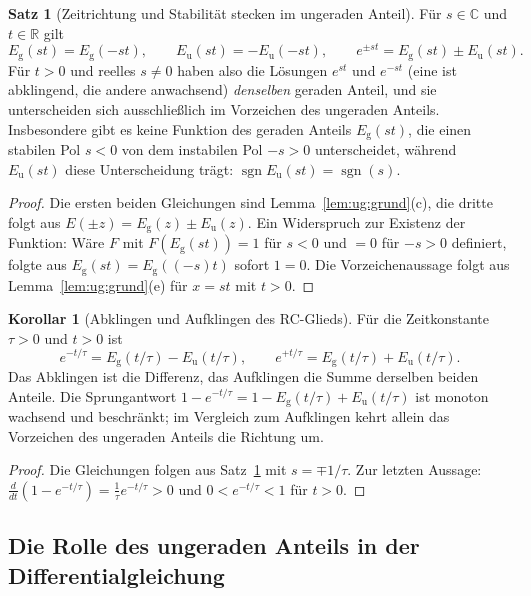 \documentclass[a4paper,12pt,twoside]{report}
\theoremstyle{definition}
\newtheorem{satz}{Satz}
\newtheorem{korollar}{Korollar}
\begin{document}
\begin{satz}[Zeitrichtung und Stabilität stecken im ungeraden Anteil]\label{satz:ug:stab}
Für $s\in\mathbb{C}$ und $t\in\mathbb{R}$ gilt
\[
E_{\mathrm g}(st)=E_{\mathrm g}(-st),\qquad E_{\mathrm u}(st)=-E_{\mathrm u}(-st),\qquad e^{\pm st}=E_{\mathrm g}(st)\pm E_{\mathrm u}(st).
\]
Für $t>0$ und reelles $s\neq0$ haben also die Lösungen $e^{st}$ und $e^{-st}$ (eine ist abklingend, die andere anwachsend) \emph{denselben} geraden Anteil, und sie unterscheiden sich ausschließlich im Vorzeichen des ungeraden Anteils. Insbesondere gibt es keine Funktion des geraden Anteils $E_{\mathrm g}(st)$, die einen stabilen Pol $s<0$ von dem instabilen Pol $-s>0$ unterscheidet, während $E_{\mathrm u}(st)$ diese Unterscheidung trägt: $\operatorname{sgn}E_{\mathrm u}(st)=\operatorname{sgn}(s)$.
\end{satz}

\begin{proof}
Die ersten beiden Gleichungen sind Lemma~\ref{lem:ug:grund}(c), die dritte folgt aus $E(\pm z)=E_{\mathrm g}(z)\pm E_{\mathrm u}(z)$. Ein Widerspruch zur Existenz der Funktion: Wäre $F$ mit $F(E_{\mathrm g}(st))=1$ für $s<0$ und $=0$ für $-s>0$ definiert, folgte aus $E_{\mathrm g}(st)=E_{\mathrm g}((-s)t)$ sofort $1=0$. Die Vorzeichenaussage folgt aus Lemma~\ref{lem:ug:grund}(e) für $x=st$ mit $t>0$.
\end{proof}

\begin{korollar}[Abklingen und Aufklingen des RC-Glieds]\label{kor:ug:rc}
Für die Zeitkonstante $\tau>0$ und $t>0$ ist
\[
e^{-t/\tau}=E_{\mathrm g}(t/\tau)-E_{\mathrm u}(t/\tau),\qquad e^{+t/\tau}=E_{\mathrm g}(t/\tau)+E_{\mathrm u}(t/\tau).
\]
Das Abklingen ist die Differenz, das Aufklingen die Summe derselben beiden Anteile. Die Sprungantwort $1-e^{-t/\tau}=1-E_{\mathrm g}(t/\tau)+E_{\mathrm u}(t/\tau)$ ist monoton wachsend und beschränkt; im Vergleich zum Aufklingen kehrt allein das Vorzeichen des ungeraden Anteils die Richtung um.
\end{korollar}

\begin{proof}
Die Gleichungen folgen aus Satz~\ref{satz:ug:stab} mit $s=\mp1/\tau$. Zur letzten Aussage: $\frac{d}{dt}(1-e^{-t/\tau})=\frac1\tau e^{-t/\tau}>0$ und $0<e^{-t/\tau}<1$ für $t>0$.
\end{proof}

\subsection{Die Rolle des ungeraden Anteils in der Differentialgleichung}
\label{sec:ug:dgl}
\end{document}
